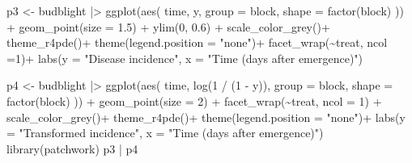 \documentclass[
  letterpaper,
]{book}
\newenvironment{Shaded}{\begin{snugshade}}{\end{snugshade}}
\newcommand{\AttributeTok}[1]{\textcolor[rgb]{0.40,0.45,0.13}{#1}}
\newcommand{\DecValTok}[1]{\textcolor[rgb]{0.68,0.00,0.00}{#1}}
\newcommand{\FloatTok}[1]{\textcolor[rgb]{0.68,0.00,0.00}{#1}}
\newcommand{\FunctionTok}[1]{\textcolor[rgb]{0.28,0.35,0.67}{#1}}
\newcommand{\NormalTok}[1]{\textcolor[rgb]{0.00,0.23,0.31}{#1}}
\newcommand{\OtherTok}[1]{\textcolor[rgb]{0.00,0.23,0.31}{#1}}
\newcommand{\SpecialCharTok}[1]{\textcolor[rgb]{0.37,0.37,0.37}{#1}}
\newcommand{\StringTok}[1]{\textcolor[rgb]{0.13,0.47,0.30}{#1}}
\begin{document}
\begin{Shaded}
\begin{Highlighting}[]
\NormalTok{p3 }\OtherTok{\textless{}{-}}\NormalTok{ budblight }\SpecialCharTok{|\textgreater{}}
  \FunctionTok{ggplot}\NormalTok{(}\FunctionTok{aes}\NormalTok{(}
\NormalTok{    time, y,}
    \AttributeTok{group =}\NormalTok{ block,}
    \AttributeTok{shape =} \FunctionTok{factor}\NormalTok{(block)}
\NormalTok{  )) }\SpecialCharTok{+}
  \FunctionTok{geom\_point}\NormalTok{(}\AttributeTok{size =} \FloatTok{1.5}\NormalTok{) }\SpecialCharTok{+}
  \FunctionTok{ylim}\NormalTok{(}\DecValTok{0}\NormalTok{, }\FloatTok{0.6}\NormalTok{) }\SpecialCharTok{+}
  \FunctionTok{scale\_color\_grey}\NormalTok{()}\SpecialCharTok{+}
  \FunctionTok{theme\_r4pde}\NormalTok{()}\SpecialCharTok{+}
  \FunctionTok{theme}\NormalTok{(}\AttributeTok{legend.position =} \StringTok{"none"}\NormalTok{)}\SpecialCharTok{+}
  \FunctionTok{facet\_wrap}\NormalTok{(}\SpecialCharTok{\textasciitilde{}}\NormalTok{treat, }\AttributeTok{ncol =}\DecValTok{1}\NormalTok{)}\SpecialCharTok{+}
  \FunctionTok{labs}\NormalTok{(}\AttributeTok{y =} \StringTok{"Disease incidence"}\NormalTok{,}
       \AttributeTok{x =} \StringTok{"Time (days after emergence)"}\NormalTok{)}

\NormalTok{p4 }\OtherTok{\textless{}{-}}\NormalTok{ budblight }\SpecialCharTok{|\textgreater{}}
  \FunctionTok{ggplot}\NormalTok{(}\FunctionTok{aes}\NormalTok{(}
\NormalTok{    time, }\FunctionTok{log}\NormalTok{(}\DecValTok{1} \SpecialCharTok{/}\NormalTok{ (}\DecValTok{1} \SpecialCharTok{{-}}\NormalTok{ y)),}
    \AttributeTok{group =}\NormalTok{ block,}
    \AttributeTok{shape =} \FunctionTok{factor}\NormalTok{(block)}
\NormalTok{  )) }\SpecialCharTok{+}
  \FunctionTok{geom\_point}\NormalTok{(}\AttributeTok{size =} \DecValTok{2}\NormalTok{) }\SpecialCharTok{+}
  \FunctionTok{facet\_wrap}\NormalTok{(}\SpecialCharTok{\textasciitilde{}}\NormalTok{treat, }\AttributeTok{ncol =} \DecValTok{1}\NormalTok{) }\SpecialCharTok{+}
  \FunctionTok{scale\_color\_grey}\NormalTok{()}\SpecialCharTok{+}
  \FunctionTok{theme\_r4pde}\NormalTok{()}\SpecialCharTok{+}
  \FunctionTok{theme}\NormalTok{(}\AttributeTok{legend.position =} \StringTok{"none"}\NormalTok{)}\SpecialCharTok{+}
  \FunctionTok{labs}\NormalTok{(}\AttributeTok{y =} \StringTok{"Transformed incidence"}\NormalTok{, }\AttributeTok{x =} \StringTok{"Time (days after emergence)"}\NormalTok{)}
\FunctionTok{library}\NormalTok{(patchwork)}
\NormalTok{p3 }\SpecialCharTok{|}\NormalTok{ p4}
\end{Highlighting}
\end{Shaded}
\end{document}

